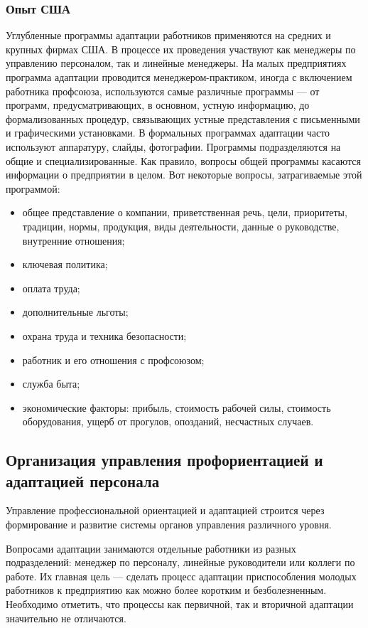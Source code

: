 \documentclass[a4paper,12pt,oneside,final]{extarticle}
\numberwithin{equation}{section}
\begin{document}
\subsubsection{Опыт США}
Углубленные программы адаптации работников применяются на средних и крупных фирмах США. 
В процессе их проведения участвуют как менеджеры по управлению персоналом, так и линейные менеджеры. 
На малых предприятиях программа адаптации проводится менеджером-практиком, иногда с включением работника профсоюза, используются самые различные программы --- от программ, предусматривающих, в основном, устную информацию, до формализованных процедур, связывающих устные представления с письменными и графическими установками. 
В формальных программах адаптации часто используют аппаратуру, слайды, фотографии. 
Программы подразделяются на общие и специализированные. Как правило, вопросы общей программы касаются информации о предприятии в целом. 
Вот некоторые вопросы, затрагиваемые этой программой: 
\begin{itemize}
	\item общее представление о компании, приветственная речь, цели, приоритеты, традиции, нормы, продукция, виды деятельности, данные о руководстве, внутренние отношения; 
	\item ключевая политика; 
	\item оплата труда; 
	\item дополнительные льготы; 
	\item охрана труда и техника безопасности; 
	\item работник и его отношения с профсою­зом; 
	\item служба быта; 
	\item экономические факторы: прибыль, стоимость рабочей силы, стоимость оборудования, ущерб от прогулов, опозданий, несчастных случаев.
\end{itemize}

\subsection{Организация управления профориентацией и адаптацией персонала}
Управление профессиональной ориентацией и адаптацией строится через формирование и развитие системы органов управления различного уровня.

Вопросами адаптации занимаются отдельные работники из разных подразделений: менеджер по персоналу, линейные руководители или коллеги по работе. 
Их главная цель --- сделать процесс адаптации приспособления молодых работников к предприятию как можно более коротким и безболезненным. 
Необходимо отметить, что процессы как первичной, так и вторичной адаптации значительно не отличаются.
\end{document}
